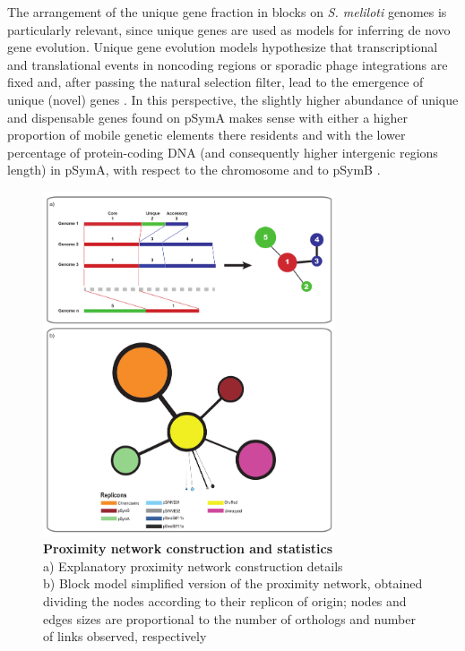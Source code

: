 The arrangement of the unique gene fraction in blocks on \textit{S. meliloti} genomes is particularly relevant, since unique genes are used as models for inferring de novo gene evolution. Unique gene evolution models hypothesize that transcriptional and translational events in noncoding regions or sporadic phage integrations are fixed and, after passing the natural selection filter, lead to the emergence of unique (novel) genes \cite{yomtovian2010composition}\cite{carvunis2012proto}. In this perspective, the slightly higher abundance of unique and dispensable genes found on pSymA makes sense with either a higher proportion of mobile genetic elements there residents \cite{biondi2011spread} and with the lower percentage of protein-coding DNA (and consequently higher intergenic regions length) in pSymA, with respect to the chromosome and to pSymB \cite{galardini2011exploring}.
\begin{figure}[!tb]
	\center
    \includegraphics[width=0.77\textwidth]{figures/4/thesis_34}
	\caption{\label{fig:network}\textbf{Proximity network construction and statistics}\\
	a) Explanatory proximity network construction details\\
	b) Block model simplified version of the proximity network, obtained dividing the nodes according to their replicon of origin; nodes and edges sizes are proportional to the number of orthologs and number of links observed, respectively}
\end{figure}
